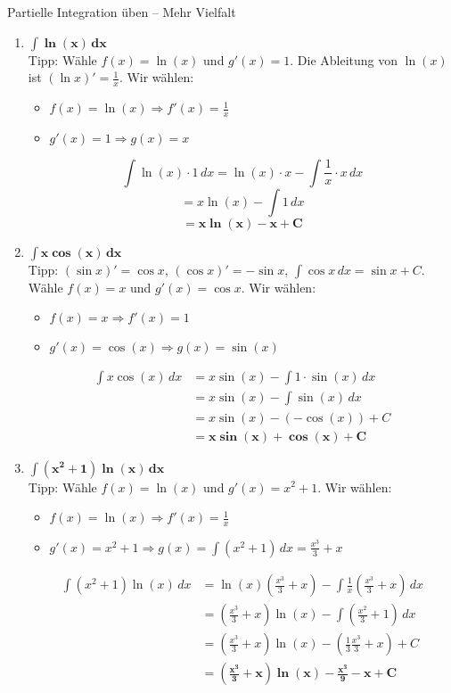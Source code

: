 \begin{loesungsumgebung}{Partielle Integration üben – Mehr Vielfalt}
\begin{enumerate}[label=(\alph*)]
    \item $\mathbf{\int \ln(x) \,dx}$ \\
    Tipp: Wähle $f(x)=\ln(x)$ und $g'(x)=1$. Die Ableitung von $\ln(x)$ ist $(\ln x)' = \frac{1}{x}$.
    Wir wählen:
    \begin{itemize}
        \item $f(x) = \ln(x) \Rightarrow f'(x) = \frac{1}{x}$
        \item $g'(x) = 1 \Rightarrow g(x) = x$
    \end{itemize}
    $$ \int \ln(x) \cdot 1 \,dx = \ln(x) \cdot x - \int \frac{1}{x} \cdot x \,dx $$
    $$ = x\ln(x) - \int 1 \,dx $$
    $$ = \mathbf{x\ln(x) - x + C} $$

    \item $\mathbf{\int x \cos(x) \,dx}$ \\
    Tipp: $(\sin x)' = \cos x$, $(\cos x)' = -\sin x$, $\int \cos x \,dx = \sin x + C$. Wähle $f(x)=x$ und $g'(x)=\cos x$.
    Wir wählen:
    \begin{itemize}
        \item $f(x) = x \Rightarrow f'(x) = 1$
        \item $g'(x) = \cos(x) \Rightarrow g(x) = \sin(x)$
    \end{itemize}
    \begin{align*} \int x \cos(x) \,dx &= x\sin(x) - \int 1 \cdot \sin(x) \,dx \\ &= x\sin(x) - \int \sin(x) \,dx \\ &= x\sin(x) - (-\cos(x)) + C \\ &= \mathbf{x\sin(x) + \cos(x) + C} \end{align*}

    \item $\mathbf{\int (x^2+1)\ln(x) \,dx}$ \\
    Tipp: Wähle $f(x)=\ln(x)$ und $g'(x)=x^2+1$.
    Wir wählen:
    \begin{itemize}
        \item $f(x) = \ln(x) \Rightarrow f'(x) = \frac{1}{x}$
        \item $g'(x) = x^2+1 \Rightarrow g(x) = \int (x^2+1) \,dx = \frac{x^3}{3} + x$
    \end{itemize}
    \begin{align*} \int (x^2+1)\ln(x) \,dx &= \ln(x) \left(\frac{x^3}{3} + x\right) - \int \frac{1}{x} \left(\frac{x^3}{3} + x\right) \,dx \\ &= \left(\frac{x^3}{3} + x\right)\ln(x) - \int \left(\frac{x^2}{3} + 1\right) \,dx \\ &= \left(\frac{x^3}{3} + x\right)\ln(x) - \left(\frac{1}{3}\frac{x^3}{3} + x\right) + C \\ &= \mathbf{\left(\frac{x^3}{3} + x\right)\ln(x) - \frac{x^3}{9} - x + C} \end{align*}


\end{enumerate}
\end{loesungsumgebung}

